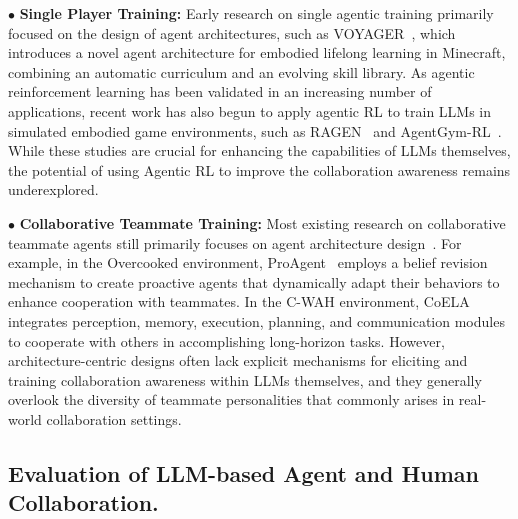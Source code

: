 \documentclass{article}
\theoremstyle{plain}
\theoremstyle{definition}
\theoremstyle{remark}
\begin{document}
$\bullet$ \textbf{Single Player Training:} Early research on single agentic training primarily focused on the design of agent architectures, such as VOYAGER~\cite{WangX0MXZFA24}, which introduces a novel agent architecture for embodied lifelong learning in Minecraft, combining an automatic curriculum and an evolving skill library. As agentic reinforcement learning has been validated in an increasing number of applications, recent work has also begun to apply agentic RL to train LLMs in simulated embodied game environments, such as RAGEN~\cite{wang2025ragen} and AgentGym-RL~\cite{xi2025agentgymrl}. While these studies are crucial for enhancing the capabilities of LLMs themselves, the potential of using Agentic RL to improve the collaboration awareness remains underexplored.

$\bullet$ \textbf{Collaborative Teammate Training:} Most existing research on collaborative teammate agents still primarily focuses on agent architecture design~\cite{ZhangDSZDTSG24,ZhangYHWLSZZLZC24,SeoNLLLK25}. For example, in the Overcooked environment, ProAgent~\cite{ZhangYHWLSZZLZC24} employs a belief revision mechanism to create proactive agents that dynamically adapt their behaviors to enhance cooperation with teammates. In the C-WAH environment, CoELA~\cite{ZhangDSZDTSG24} integrates perception, memory, execution, planning, and communication modules to cooperate with others in accomplishing long-horizon tasks. However, architecture-centric designs often lack explicit mechanisms for eliciting and training collaboration awareness within LLMs themselves, and they generally overlook the diversity of teammate personalities that commonly arises in real-world collaboration settings.

\subsection{Evaluation of LLM-based Agent and Human Collaboration.} 
\end{document}
